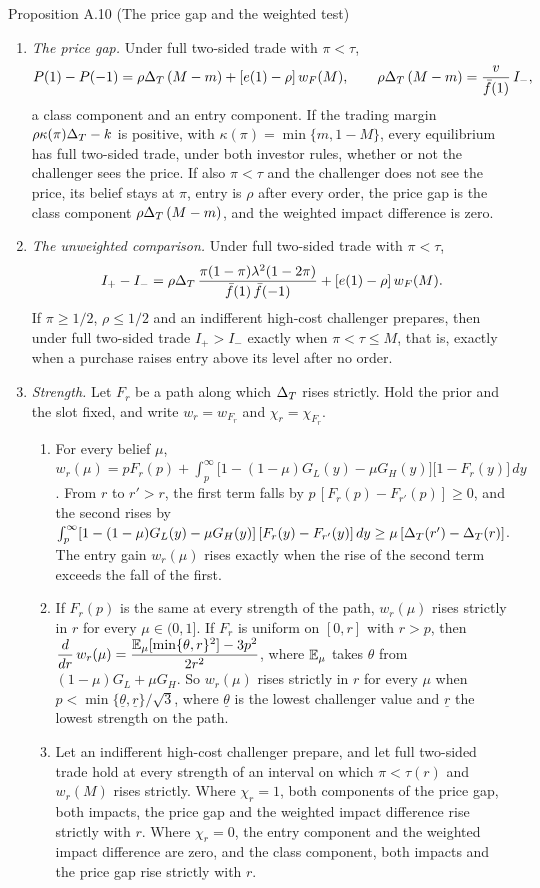 \begin{paperresult}{Proposition A.10 (The price gap and the weighted test)}
\begin{enumerate}[label=(\roman*),leftmargin=2em]
\item \emph{The price gap.} Under full two-sided trade with \(\pi<\tau\),
\[
P(1)-P(-1)=\rho\Delta_T\,(M-m)+[e(1)-\rho]\,w_F(M),\qquad \rho\Delta_T\,(M-m)=\frac{v}{\bar f(1)}\,I_-,
\]
a class component and an entry component. If the trading margin \(\rho\kappa(\pi)\Delta_T-k\) is positive, with \(\kappa(\pi)=\min\{m,1-M\}\), every equilibrium has full two-sided trade, under both investor rules, whether or not the challenger sees the price. If also \(\pi<\tau\) and the challenger does not see the price, its belief stays at \(\pi\), entry is \(\rho\) after every order, the price gap is the class component \(\rho\Delta_T\,(M-m)\), and the weighted impact difference is zero.
\item \emph{The unweighted comparison.} Under full two-sided trade with \(\pi<\tau\),
\[
I_+-I_-=\rho\Delta_T\,\frac{\pi(1-\pi)\lambda^2(1-2\pi)}{\bar f(1)\,\bar f(-1)}+[e(1)-\rho]\,w_F(M).
\]
If \(\pi\ge1/2\), \(\rho\le1/2\) and an indifferent high-cost challenger prepares, then under full two-sided trade \(I_+>I_-\) exactly when \(\pi<\tau\le M\), that is, exactly when a purchase raises entry above its level after no order.
\item \emph{Strength.} Let \(F_r\) be a path along which \(\Delta_T\) rises strictly. Hold the prior and the slot fixed, and write \(w_r=w_{F_r}\) and \(\chi_r=\chi_{F_r}\).
\begin{enumerate}[label=(\alph*),leftmargin=2em]
\item For every belief \(\mu\), \(w_r(\mu)=pF_r(p)+\int_p^\infty\bigl[1-(1-\mu)G_L(y)-\mu G_H(y)\bigr]\bigl[1-F_r(y)\bigr]\,dy\). From \(r\) to \(r'>r\), the first term falls by \(p\,[F_r(p)-F_{r'}(p)]\ge0\), and the second rises by \(\int_p^\infty[1-(1-\mu)G_L(y)-\mu G_H(y)]\,[F_r(y)-F_{r'}(y)]\,dy\ge\mu\,[\Delta_T(r')-\Delta_T(r)]\). The entry gain \(w_r(\mu)\) rises exactly when the rise of the second term exceeds the fall of the first.
\item If \(F_r(p)\) is the same at every strength of the path, \(w_r(\mu)\) rises strictly in \(r\) for every \(\mu\in(0,1]\). If \(F_r\) is uniform on \([0,r]\) with \(r>p\), then \(\dfrac{d}{dr}\,w_r(\mu)=\dfrac{\mathbb{E}_\mu[\min\{\theta,r\}^2]-3p^2}{2r^2}\), where \(\mathbb{E}_\mu\) takes \(\theta\) from \((1-\mu)G_L+\mu G_H\). So \(w_r(\mu)\) rises strictly in \(r\) for every \(\mu\) when \(p<\min\{\underline\theta,\underline r\}/\sqrt3\), where \(\underline\theta\) is the lowest challenger value and \(\underline r\) the lowest strength on the path.
\item Let an indifferent high-cost challenger prepare, and let full two-sided trade hold at every strength of an interval on which \(\pi<\tau(r)\) and \(w_r(M)\) rises strictly. Where \(\chi_r=1\), both components of the price gap, both impacts, the price gap and the weighted impact difference rise strictly with \(r\). Where \(\chi_r=0\), the entry component and the weighted impact difference are zero, and the class component, both impacts and the price gap rise strictly with \(r\).

\end{enumerate}
\end{enumerate}
\end{paperresult}
